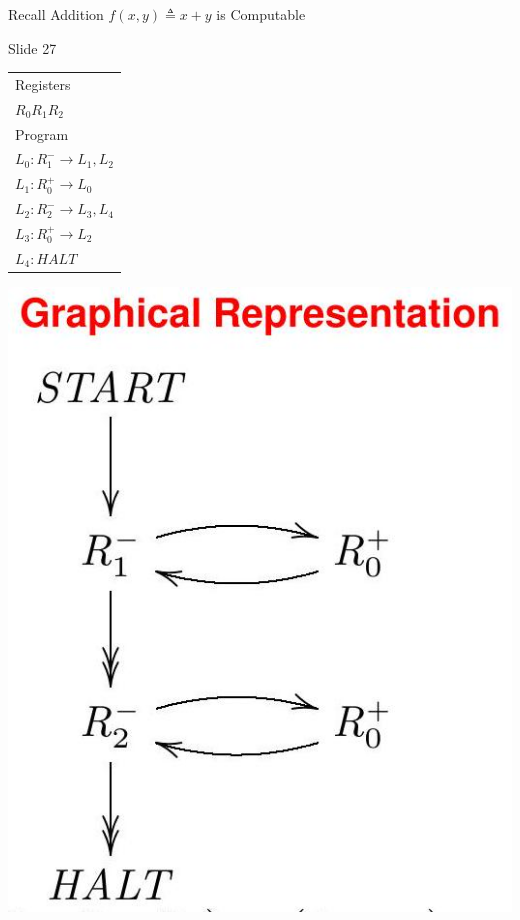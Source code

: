 \documentclass[10pt]{article}
\begin{document}
Recall Addition $f(x, y) \triangleq x+y$ is Computable

Slide 27

\begin{center}
\begin{tabular}{|l|}
\hline
Registers \\
$R_{0} R_{1} R_{2}$ \\
Program \\
$L_{0}: R_{1}^{-} \rightarrow L_{1}, L_{2}$ \\
$L_{1}: R_{0}^{+} \rightarrow L_{0}$ \\
$L_{2}: R_{2}^{-} \rightarrow L_{3}, L_{4}$ \\
$L_{3}: R_{0}^{+} \rightarrow L_{2}$ \\
$L_{4}: H A L T$ \\
\hline
\end{tabular}
\end{center}

\begin{center}
\includegraphics[max width=\textwidth]{2025_05_09_e840a83aab7eebacdc7fg-21}
\end{center}
\end{document}
